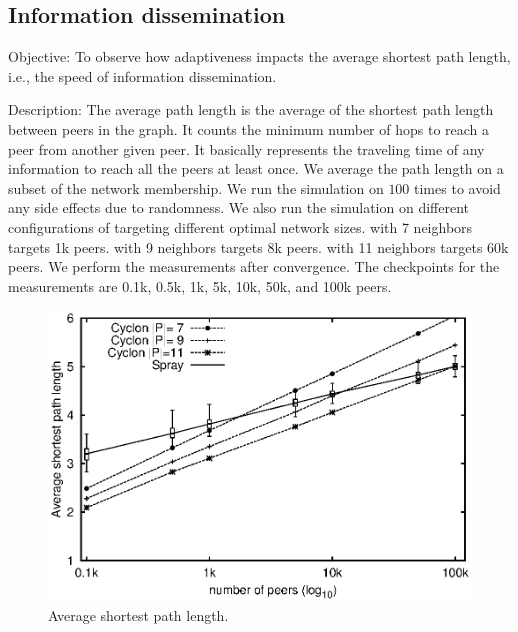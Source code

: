 \subsection{Information dissemination}

\begin{asparadesc}
\item[Objective:] To observe how adaptiveness impacts the average shortest path
  length, i.e., the speed of information dissemination.
\item[Description:] The average path length is the average of the
  shortest path length between peers in the graph. It counts the
  minimum number of hops to reach a peer from another given peer. It
  basically represents the traveling time of any information to reach
  all the peers at least once. We average the path length on a subset
  of the network membership. We run the simulation on \SPRAY $100$
  times to avoid any side effects due to randomness. We also run the
  simulation on different configurations of \CYCLON targeting
  different optimal network sizes. \CYCLON with 7 neighbors targets 1k
  peers. \CYCLON with 9 neighbors targets 8k peers. \CYCLON with 11
  neighbors targets 60k peers. We perform the measurements after
  convergence. The checkpoints for the measurements are 0.1k, 0.5k,
  1k, 5k, 10k, 50k, and 100k peers.

\begin{figure}
  \centering
  \includegraphics[width=\SCALE\textwidth]{img/avgpath.eps}
  \caption{\label{fig:avgpath}Average shortest path length.}
\end{figure}


\end{asparadesc}
